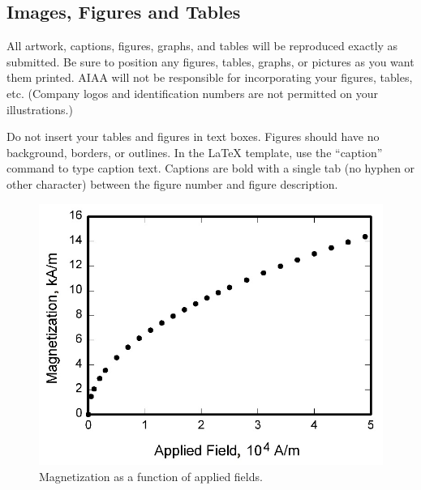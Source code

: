 \documentclass[conf]{new-aiaa}
\begin{document}
\subsection{Images, Figures and Tables}
All artwork, captions, figures, graphs, and tables will be reproduced exactly as submitted. Be sure to position any figures, tables, graphs, or pictures as you want them printed. AIAA will not be responsible for incorporating your figures, tables, etc. (Company logos and identification numbers are not permitted on your illustrations.)

Do not insert your tables and figures in text boxes. Figures should have no background, borders, or outlines. In the \LaTeX{} template, use the ``caption'' command to type caption text. Captions are bold with a single tab (no hyphen or other character) between the figure number and figure description.



\begin{figure}[hbt!]
\centering
\includegraphics[width=.5\textwidth]{graph}
\caption{Magnetization as a function of applied fields.}
\end{figure}
\end{document}
